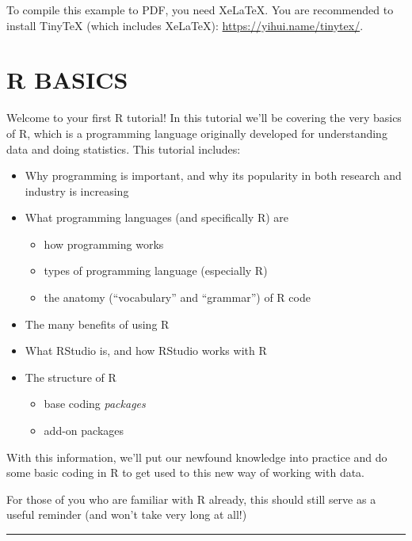 \documentclass[
]{book}
\providecommand{\tightlist}{%
  \setlength{\itemsep}{0pt}\setlength{\parskip}{0pt}}
\begin{document}
To compile this example to PDF, you need XeLaTeX. You are recommended to install TinyTeX (which includes XeLaTeX): \url{https://yihui.name/tinytex/}.

\hypertarget{r-basics}{%
\chapter{R BASICS}\label{r-basics}}

Welcome to your first R tutorial! In this tutorial we'll be covering the very basics of R, which is a programming language originally developed for
understanding data and doing statistics. This tutorial includes:

\begin{itemize}
\tightlist
\item
  Why programming is important, and why its popularity in both research
  and industry is increasing
\item
  What programming languages (and specifically R) are

  \begin{itemize}
  \tightlist
  \item
    how programming works
  \item
    types of programming language (especially R)
  \item
    the anatomy (``vocabulary'' and ``grammar'') of R code
  \end{itemize}
\item
  The many benefits of using R
\item
  What RStudio is, and how RStudio works with R
\item
  The structure of R

  \begin{itemize}
  \tightlist
  \item
    base coding \emph{packages}
  \item
    add-on packages
  \end{itemize}
\end{itemize}

With this information, we'll put our newfound knowledge into practice and
do some basic coding in R to get used to this new way of working with data.

For those of you who are familiar with R already, this should still serve as a
useful reminder (and won't take very long at all!)\\
\hspace*{0.333em}

\begin{center}\rule{0.5\linewidth}{0.5pt}\end{center}
\end{document}
